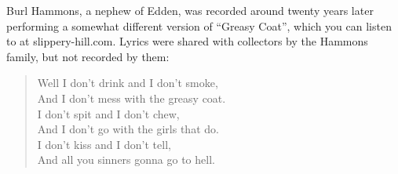 \documentclass[12pt]{article}
\begin{document}
{\begin{minipage}{7.0in}
  Burl Hammons, a nephew of Edden, was recorded around twenty years
  later performing a somewhat different version of ``Greasy Coat'',
  which you can listen to at slippery-hill.com. Lyrics were shared
  with collectors by the Hammons family, but not recorded by them:

  \begin{quote}
    Well I don't drink and I don't smoke,\\
    And I don't mess with the greasy coat.\\
    I don't spit and I don't chew,\\
    And I don't go with the girls that do.\\
    I don't kiss and I don't tell,\\
    And all you sinners gonna go to hell.
  \end{quote}
\end{minipage}
}
\end{document}
